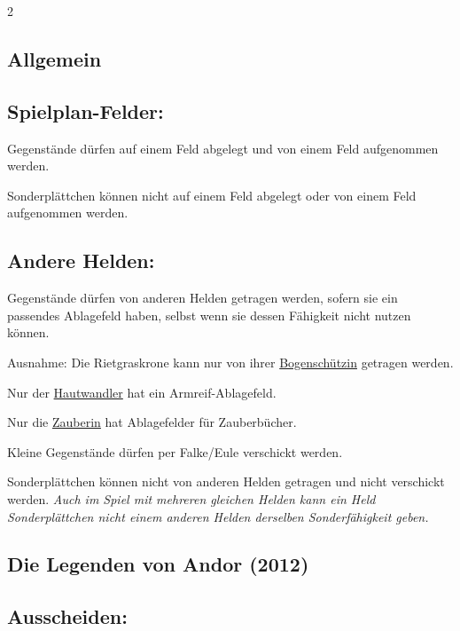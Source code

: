 \documentclass[10pt, a4paper, oneside]{book}
\newcommand{\fan}[1]{\textit{#1}}
\begin{document}
\begin{multicols*}{2}
\begin{nobgcolor}
\section{Allgemein}


\subsection{Spielplan-Felder:}
Gegenstände dürfen auf einem Feld abgelegt und von einem Feld aufgenommen werden.

Sonderplättchen können nicht auf einem Feld abgelegt oder von einem Feld aufgenommen werden.
\supercite{117803}

\subsection{Andere Helden:}
Gegenstände dürfen von anderen Helden getragen werden, sofern sie ein passendes Ablagefeld haben, selbst wenn sie dessen Fähigkeit nicht nutzen können.

Ausnahme: Die Rietgraskrone kann nur von ihrer \hyperref[Bogenschützin]{Bogenschützin} getragen werden.

Nur der \hyperref[Hautwandler]{Hautwandler} hat ein Armreif-Ablagefeld.

Nur die \hyperref[Zauberin]{Zauberin} hat Ablagefelder für Zauberbücher.

Kleine Gegenstände dürfen per Falke/Eule verschickt werden.

Sonderplättchen können nicht von anderen Helden getragen und nicht verschickt werden. \fan{Auch im Spiel mit mehreren gleichen Helden kann ein Held Sonderplättchen nicht einem anderen Helden derselben Sonderfähigkeit geben.}

\end{nobgcolor}



\columnbreak


\begin{bgcolor}
\section{Die Legenden von Andor (2012)}



\subsection{Ausscheiden:}


\end{bgcolor}
\end{multicols*}
\end{document}
